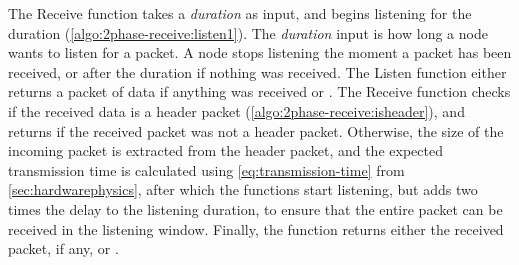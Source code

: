 The Receive function takes a \textit{duration} as input, and begins listening for the duration
(\autoref{algo:2phase-receive:listen1}). The \textit{duration} input is how long a node wants to listen for a
packet. A node stops listening the moment a packet has been received, or after the duration if nothing was
received. The Listen function either returns a packet of data if anything was received or \KwNull. The
Receive function checks if the received data is a header packet (\autoref{algo:2phase-receive:isheader}), and
returns \KwNull if the received packet was not a header packet. Otherwise, the size of the incoming packet is
extracted from the header packet, and the expected transmission time is calculated using
\autoref{eq:transmission-time} from \autoref{sec:hardwarephysics}, after which the functions start listening,
but adds two times the delay to the listening duration, to ensure that the entire packet can be received in
the listening window. Finally, the function returns either the received packet, if any, or \KwNull.
